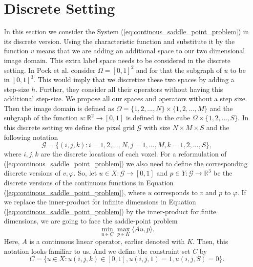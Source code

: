 \documentclass[abstracton]{scrreprt}
\begin{document}
    \section{Discrete Setting} %
    \label{sec:discrete_setting_ms}

        In this section we consider the System (\ref{eq:continous_saddle_point_problem}) in its discrete version. Using the characteristic function and substitute it by the function $v$ means that we are adding an additional space to our two dimensional image domain. This extra label space needs to be considered in the discrete setting. In \cite{Pock-et-al-iccv09} Pock et al. consider $\Omega = [0, 1]^{2}$ and for that the subgraph of $u$ to be in $[0, 1]^{3}$. This would imply that we discretize these two spaces by adding a step-size $h$. Further, they consider all their operators without having this additional step-size. We propose all our spaces and operators without a step size. Then the image domain is defined as $\Omega = \{1, 2, ..., N\} \times \{1, 2, ..., M\}$ and the subgraph of the function $u: \mathbb{R}^{2} \longrightarrow [0, 1]$ is defined in the cube $\Omega \times \{1, 2, ..., S\}$. In this discrete setting we define the pixel grid $\mathcal{G}$ with size $N \times M \times S$ and the following notation
            $$
                \mathcal{G} = \bigg\{ (i , j , k ): i = 1, 2, ..., N, j = 1, ..., M, k = 1, 2, ..., S \bigg\},
            $$
        where $i, j, k$ are the discrete locations of each voxel. For a reformulation of (\ref{eq:continous_saddle_point_problem}) we also need to define the corresponding discrete versions of $v, \varphi$. So, let $u \in X: \mathcal{G} \longrightarrow [0, 1]$ and $p \in Y: \mathcal{G} \longrightarrow \mathbb{R}^{3}$ be the discrete versions of the continuous functions in Equation (\ref{eq:continous_saddle_point_problem}), where $u$ corresponds to $v$ and $p$ to $\varphi$. If we replace the inner-product for infinite dimensions in Equation (\ref{eq:continous_saddle_point_problem}) by the inner-product for finite dimensions, we are going to face the saddle-point problem
            \begin{equation}
                \min_{u \in C} \max_{p \in K} \langle Au, p \rangle.
            \label{eq:mumford_shah_saddle_point_problem}
            \end{equation}
        Here, $A$ is a continuous linear operator, earlier denoted with $K$. Then, this notation looks familiar to us.  And we define the constraint set $C$ by
            \begin{equation}
                C = \{ u \in X: u(i,j,k) \in [0,1], u(i, j, 1) = 1, u(i, j, S) = 0 \}.
            \end{equation}
\end{document}
